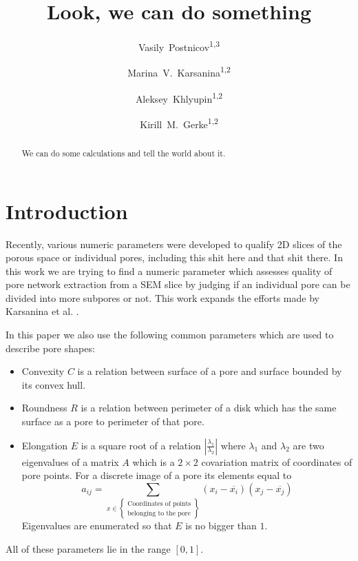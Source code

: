 \documentclass[reprint,amsmath,amssymb,aps,pre,showkeys,showpacs]{revtex4-1}
\newcommand{\highlight}[1]{{\color{red}{#1}}} %
\begin{document}

\author{Vasily~Postnicov\textsuperscript{1,3}}
\author{Marina~V.~Karsanina\textsuperscript{1,2}}
\author{Aleksey~Khlyupin\textsuperscript{1,2}}
\author{Kirill~M.~Gerke\textsuperscript{1,2}}


\title{Look, we can do something}

\begin{abstract}
We can do some calculations and tell the world about it.
\end{abstract}

\maketitle

\section{Introduction}
Recently, various numeric parameters were developed to qualify 2D slices of the
porous space or individual pores, including this shit here and that shit
there. In this work we are trying to find a numeric parameter which assesses
quality of pore network extraction from a SEM slice by judging if an individual
pore can be divided into more subpores or not. This work expands the efforts
made by Karsanina et al.\cite{PLoS_ONE} \highlight{Or not Karsanina. Must point
  to the Skvortsova's parameter}.

In this paper we also use the following common parameters which are used to
describe pore shapes:
\begin{itemize}
\item Convexity $C$ is a relation between surface of a pore and surface bounded
  by its convex hull.
\item Roundness $R$ is a relation between perimeter of a disk which has the same
  surface as a pore to perimeter of that pore.
\item Elongation $E$ is a square root of a relation
  $|\frac{\lambda_1}{\lambda_2}|$ where $\lambda_1$ and $\lambda_2$ are two
  eigenvalues of a matrix $A$ which is a $2 \times 2$ covariation matrix of
  coordinates of pore points. For a discrete image of a pore its elements equal
  to
  \begin{equation*}
    a_{ij} = \sum_{x \in \left\{
      \begin{array}{l}
        \text{Coordinates of points} \\
        \text{belonging to the pore}
      \end{array}
      \right\}} (x_i - \overline{x_i})(x_j - \overline{x_j})
  \end{equation*}
  Eigenvalues are enumerated so that $E$ is no bigger than $1$.
\end{itemize}
All of these parameters lie in the range $[0, 1]$.
\end{document}
